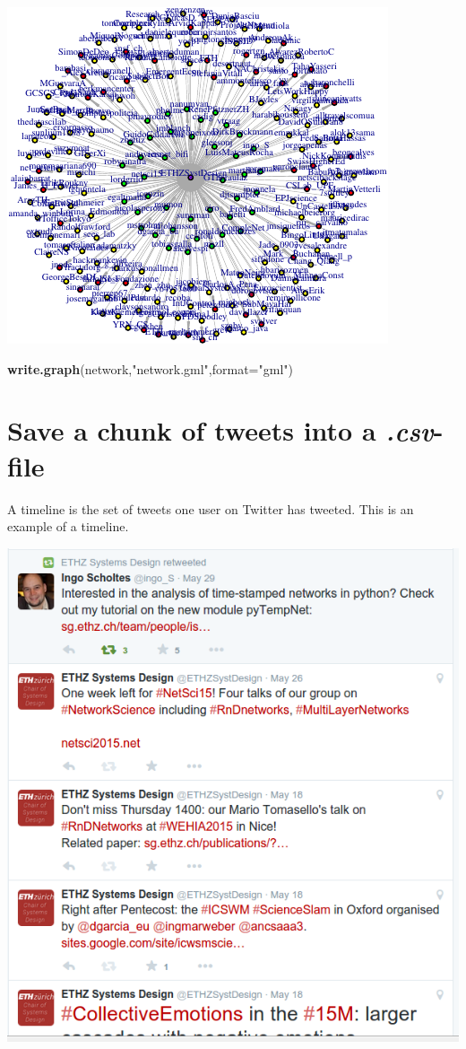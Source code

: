 \documentclass[]{article}
\newenvironment{Shaded}{\begin{snugshade}}{\end{snugshade}}
\newcommand{\KeywordTok}[1]{\textcolor[rgb]{0.13,0.29,0.53}{\textbf{{#1}}}}
\newcommand{\DataTypeTok}[1]{\textcolor[rgb]{0.13,0.29,0.53}{{#1}}}
\newcommand{\StringTok}[1]{\textcolor[rgb]{0.31,0.60,0.02}{{#1}}}
\newcommand{\NormalTok}[1]{{#1}}
\begin{document}
\includegraphics{ETH_Twitter_files/figure-latex/unnamed-chunk-2-1.pdf}

\begin{Shaded}
\begin{Highlighting}[]
\KeywordTok{write.graph}\NormalTok{(network,}\StringTok{"network.gml"}\NormalTok{,}\DataTypeTok{format=}\StringTok{"gml"}\NormalTok{)}
\end{Highlighting}
\end{Shaded}

\section{Save a chunk of tweets into a
\emph{.csv}-file}\label{save-a-chunk-of-tweets-into-a-.csv-file}

A timeline is the set of tweets one user on Twitter has tweeted. This is
an example of a timeline.

\includegraphics{figures/timeline.png}
\end{document}

